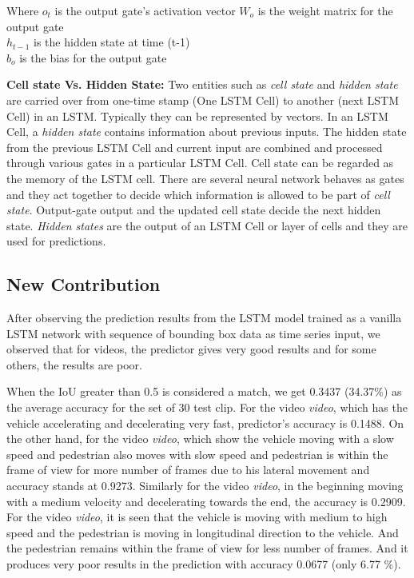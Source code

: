 \pagebreak

Where $o_t$ is the output gate's activation vector 
$W_o$ is the weight matrix for the output gate \\
$h_{t-1}$ is the hidden state at time (t-1) \\
$b_o$ is the bias for the output gate

\textbf{Cell state Vs. Hidden State:}
Two entities such as \textit{cell state} and \textit{hidden state} are carried over from one-time stamp (One LSTM Cell) to another (next LSTM Cell) in an LSTM. Typically they can be represented by vectors. In an LSTM Cell, a \textit{hidden state }contains information about previous inputs. The hidden state from the previous LSTM Cell and current input are combined and processed through various gates in a particular LSTM Cell. Cell state can be regarded as the memory of the LSTM cell. There are several neural network behaves as gates and they act together to decide which information is allowed to be part of \textit{cell state}. Output-gate output and the updated cell state decide the next hidden state. \textit{Hidden states} are the output of an LSTM Cell or layer of cells and they are used for predictions.  \\

\subsection{New Contribution} \label{novel_proposal}
After observing the prediction results from the LSTM model trained as a vanilla LSTM network with sequence of bounding box data as time series input, we observed that for videos, the predictor gives very good results and for some others, the results are poor. 

When the IoU greater than 0.5 is considered a match, we get 0.3437 (34.37\%) as the average accuracy for the set of 30 test clip. For the video \textit{video}, which has the vehicle accelerating and decelerating very fast, predictor's accuracy is 0.1488. On the other hand, for the video \textit{video}, which show the vehicle moving with a slow speed and pedestrian also moves with slow speed and pedestrian is within the frame of view for more number of frames due to his lateral movement and accuracy stands at 0.9273. Similarly for the video \textit{video}, in the beginning moving with a medium velocity and decelerating towards the end, the accuracy is 0.2909. For the video \textit{video}, it is seen that the vehicle is moving with medium to high speed and the pedestrian is moving in longitudinal direction to the vehicle. And the pedestrian remains within the frame of view for less number of frames. And it produces very poor results in the prediction with accuracy 0.0677 (only 6.77 \%). \\

